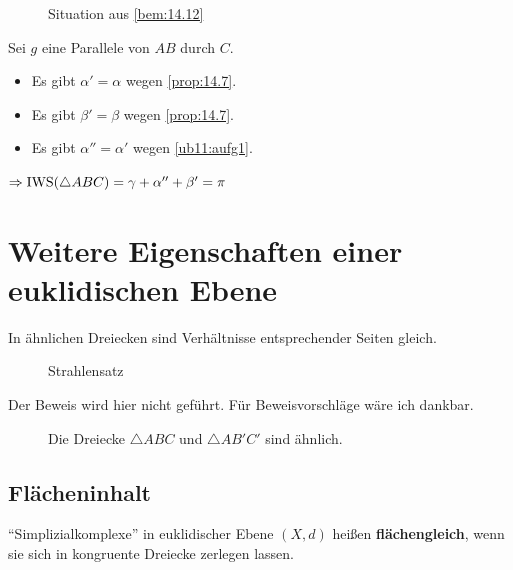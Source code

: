 \begin{figure}[htp]
    \centering
    
    \caption{Situation aus \cref{bem:14.12}}
    \label{fig:14.12}
\end{figure}

\begin{beweis}
    Sei $g$ eine Parallele von $AB$ durch $C$. 

    \begin{itemize}
        \item Es gibt $\alpha' = \alpha$ wegen \cref{prop:14.7}.
        \item Es gibt $\beta' = \beta$ wegen \cref{prop:14.7}.
        \item Es gibt $\alpha'' = \alpha'$ wegen \cref{ub11:aufg1}.
    \end{itemize}
    $\Rightarrow \operatorname{IWS}(\triangle ABC) = \gamma + \alpha'' + \beta' = \pi$
\end{beweis}

\section{Weitere Eigenschaften einer euklidischen Ebene}
\begin{satz}[Strahlensatz]
    In ähnlichen Dreiecken sind Verhältnisse entsprechender Seiten gleich.
\end{satz}

\begin{figure}[htp]
    \centering
    
    \caption{Strahlensatz}
    \label{fig:hyperbolische-geometrie-2}
\end{figure}

Der Beweis wird hier nicht geführt. Für Beweisvorschläge wäre ich 
dankbar.

\begin{figure}[htp]
    \centering
    
    \caption{Die Dreiecke $\triangle ABC$ und $\triangle AB'C'$ sind ähnlich.}
    \label{fig:triangle-similar}
\end{figure}

\subsection{Flächeninhalt}
\begin{definition}%
    \enquote{Simplizialkomplexe} in euklidischer Ebene $(X,d)$ heißen
    \textbf{flächengleich},
    wenn sie sich in kongruente Dreiecke zerlegen lassen.
\end{definition}

